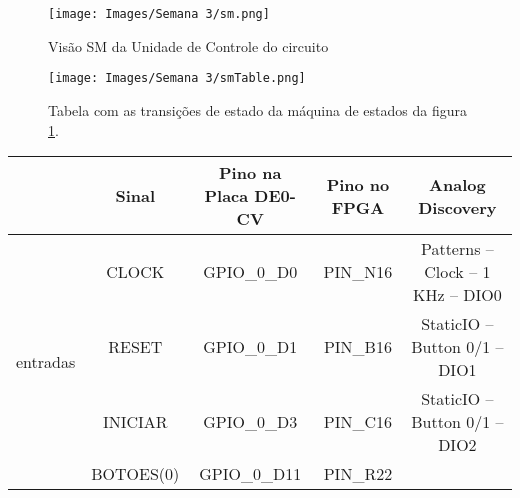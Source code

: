 \documentclass[amsmath,amssymb,floatfix]{report}
\begin{document}
\begin{figure}[H]
\centering
\texttt{[image: Images/Semana 3/sm.png]} 
    \caption{Visão SM da Unidade de Controle do circuito}
    \label{fig:sm3}
\end{figure} 

\begin{figure}[H]
\centering
\texttt{[image: Images/Semana 3/smTable.png]} 
    \caption{Tabela com as transições de estado da máquina de estados da figura \ref{fig:sm3}.}
    \label{fig:smTable3}
\end{figure}

\begin{table}[H]
\centering
\scriptsize
\begin{tabular}{c|c|c|c|c|}
\cline{2-5}
\multicolumn{1}{l|}{\textbf{}}                   & Sinal                   & Pino na Placa DE0-CV & Pino no FPGA                                                                                                                                                                          & Analog Discovery               \\ \hline
\multicolumn{1}{|c|}{\multirow{15}{*}{entradas}} & CLOCK                   & GPIO\_0\_D0          & PIN\_N16                                                                                                                                                                              & Patterns – Clock – 1 KHz – DIO0 \\ \cline{2-5} 
\multicolumn{1}{|c|}{}                           & RESET                   & GPIO\_0\_D1          & PIN\_B16                                                                                                                                                                              & StaticIO – Button 0/1 – DIO1          \\ \cline{2-5} 
\multicolumn{1}{|c|}{}                           & INICIAR                 & GPIO\_0\_D3          & PIN\_C16                                                                                                                                                                              & StaticIO – Button 0/1 – DIO2          \\ \cline{2-5} 
\multicolumn{1}{|c|}{}                           & BOTOES(0)               & GPIO\_0\_D11         & PIN\_R22                                                                                                                                                                              & \multicolumn{1}{l|}{}          \\ \cline{2-5} 

\end{tabular}
\end{table}
\end{document}
